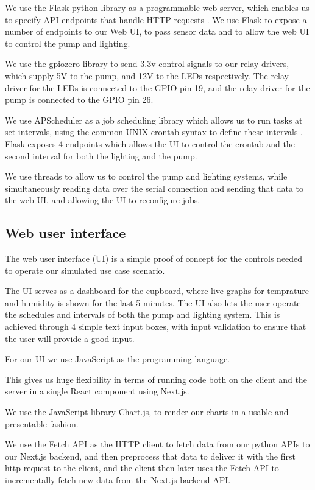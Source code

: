 \documentclass[12pt,a4paper,oneside]{book}
\begin{document}
We use the Flask python library as a programmable web server, which enables us to specify API endpoints that handle HTTP requests \cite{flask}.
We use Flask to expose a number of endpoints to our Web UI, to pass sensor data and to allow the web UI to control the pump and lighting.

We use the gpiozero library to send 3.3v control signals to our relay drivers, which supply 5V to the pump, and 12V to the LEDs respectively.
The relay driver for the LEDs is connected to the GPIO pin 19, and the relay driver for the pump is connected to the GPIO pin 26.

We use APScheduler as a job scheduling library which allows us to run tasks at set intervals, using the common UNIX crontab syntax to define these intervals \cite{apscheduler}.
Flask exposes 4 endpoints which allows the UI to control the crontab and the second interval for both the lighting and the pump.

We use threads to allow us to control the pump and lighting systems, while simultaneously reading data over the serial connection and sending that data to the web UI, and allowing the UI to reconfigure jobs.

\subsection{Web user interface}
The web user interface (UI) is a simple proof of concept for the controls needed to operate our simulated use case scenario.

The UI serves as a dashboard for the cupboard, where live graphs for temprature and humidity is shown for the last 5 minutes.
The UI also lets the user operate the schedules and intervals of both the pump and lighting system. This is achieved through 4 simple text input boxes, with input validation to ensure that the user will provide a good input.

For our UI we use JavaScript as the programming language.

This gives us huge flexibility in terms of running code both on the client and the server in a single React component using Next.js.

We use the JavaScript library Chart.js, to render our charts in a usable and presentable fashion.

We use the Fetch API as the HTTP client to fetch data from our python APIs to our Next.js backend, and then preprocess that data to deliver it with the first http request to the client, and the client then later uses the Fetch API to incrementally fetch new data from the Next.js backend API.
\end{document}
